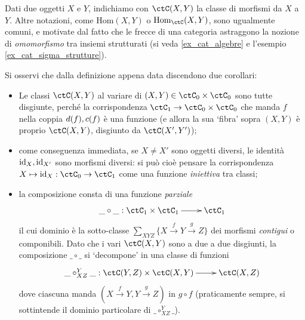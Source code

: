 \begin{notation}
	Dati due oggetti \(X\) e \(Y\), indichiamo con \(\Hom{\ctC}(X,Y)\) la classe di morfismi da \(X\) a \(Y\). Altre notazioni, come \(\mathrm{Hom}(X,Y)\) o \(\mathrm{Hom}_\ctC(X,Y)\), sono ugualmente comuni, e motivate dal fatto che le frecce di una categoria astraggono la nozione di \emph{omomorfismo} tra insiemi strutturati (si veda \ref{ex_cat_algebre} e l'esempio \ref{ex_cat_sigma_strutture}).
\end{notation}
\begin{remark}\label{cor_def_categ}
	Si osservi che dalla definizione appena data discendono due corollari:
	\begin{itemize}
		\item Le classi \(\Hom{\ctC}(X,Y)\) al variare di \((X,Y)\in\ctC_0\times\ctC_0\) sono tutte disgiunte, perché la corrispondenza \(\ctC_1 \to \ctC_0\times\ctC_0\) che manda \(f\) nella coppia \(d(f),c(f)\) è una funzione (e allora la sua `fibra' sopra \((X,Y)\) è proprio \(\Hom{\ctC}(X,Y)\), disgiunto da \(\Hom{\ctC}(X',Y')\));
		\item come conseguenza immediata, se \(X\ne X'\) sono oggetti diversi, le identità \(\mathrm{id}_X,\mathrm{id}_{X'}\) sono morfismi diversi: si può cioè pensare la corrispondenza \(X\mapsto \id_X : \ctC_0\to\ctC_1\) come una funzione \emph{iniettiva} tra classi;
		\item la composizione consta di una funzione \emph{parziale}
		      \[\xymatrix{\_\circ\_ : \ctC_1 \times \ctC_1 \ar[r] & \ctC_1}\]
		      il cui dominio è la sotto-classe \(\sum_{XYZ} \{ X \xrightarrow f Y \xrightarrow g Z \}\) dei morfismi \emph{contigui} o componibili. Dato che i vari \(\ctC(X,Y)\) sono a due a due disgiunti, la composizione \(\_\circ\_\) si `decompone' in una classe di funzioni
		      \[\xymatrix{\_\circ_{XZ}^Y\_ : \ctC(Y,Z)\times\ctC(X,Y) \ar[r] & \ctC(X,Z)}\]
		      dove ciascuna manda \(( X \xrightarrow f Y, Y \xrightarrow g Z )\) in \(g\circ f\) (praticamente sempre, si sottintende il dominio particolare di \(\_\circ_{XZ}^Y\_\)).
	\end{itemize}
\end{remark}
